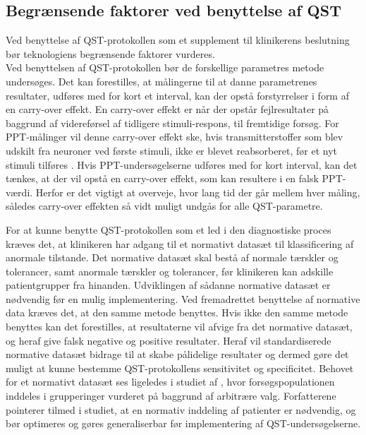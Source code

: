 \subsection{Begrænsende faktorer ved benyttelse af QST}
Ved benyttelse af QST-protokollen som et supplement til klinikerens beslutning bør teknologiens begrænsende faktorer vurderes. \\
Ved benyttelsen af QST-protokollen bør de forskellige parametres metode undersøges. Det kan forestilles, at målingerne til at danne parametrenes resultater, udføres med for kort et interval, kan der opstå forstyrrelser i form af en carry-over effekt. En carry-over effekt er når der opstår fejlresultater på baggrund af videreførsel af tidligere stimuli-respons, til fremtidige forsøg. \citep{Porta2008} For PPT-målinger vil denne carry-over effekt ske, hvis transmitterstoffer som blev udskilt fra neuroner ved første stimuli, ikke er blevet reabsorberet, før et nyt stimuli tilføres \citep{Martini2012}. Hvis PPT-undersøgelserne udføres med for kort interval, kan det tænkes, at der vil opstå en carry-over effekt, som kan resultere i en falsk PPT-værdi. Herfor er det vigtigt at overveje, hvor lang tid der går mellem hver måling, således carry-over effekten så vidt muligt undgås for alle QST-parametre. \citep{Porta2008} 

For at kunne benytte QST-protokollen som et led i den diagnostiske proces kræves det, at klinikeren har adgang til et normativt datasæt til klassificering af anormale tilstande. Det normative datasæt skal bestå af normale tærskler og tolerancer, samt anormale tærskler og tolerancer, før klinikeren kan adskille patientgrupper fra hinanden. Udviklingen af sådanne normative datasæt er nødvendig før en mulig implementering. Ved fremadrettet benyttelse af normative data kræves det, at den samme metode benyttes. Hvis ikke den samme metode benyttes kan det forestilles, at resultaterne vil afvige fra det normative datasæt, og heraf give falsk negative og positive resultater. Heraf vil standardiserede normative datasæt bidrage til at skabe pålidelige resultater og dermed gøre det muligt at kunne bestemme QST-protokollens sensitivitet og specificitet. \citep{Yarnitsky1997} Behovet for et normativt datasæt ses ligeledes i studiet af , hvor forsøgspopulationen inddeles i grupperinger vurderet på baggrund af arbitrære valg. Forfatterene pointerer tilmed i studiet, at en normativ inddeling af patienter er nødvendig, og bør optimeres og gøres generaliserbar før implementering af QST-undersøgelserne. \citep{Petersen2016} 


